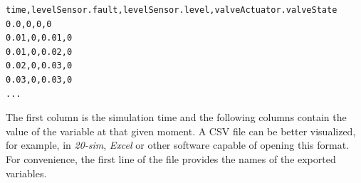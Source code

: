 \documentclass{crescendorepchap}
\begin{document}
\begin{verbatim}
time,levelSensor.fault,levelSensor.level,valveActuator.valveState
0.0,0,0,0
0.01,0,0.01,0
0.01,0,0.02,0
0.02,0,0.03,0
0.03,0,0.03,0
...
\end{verbatim}

The first column is the simulation time and the following columns contain
the value of the variable at that given moment. A CSV file can be better visualized, for
example, in \emph{20-sim}, \emph{Excel} or other software capable of
opening this format. For convenience, the first line of the file provides the names of
the exported variables.





\end{document}
